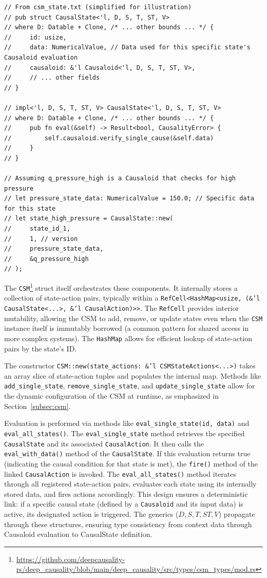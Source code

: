 \begin{lstlisting}[label={list:csm_state_def}, caption={Conceptual Definition of \texttt{CausalState} in Rust.}]
// From csm_state.txt (simplified for illustration)
// pub struct CausalState<'l, D, S, T, ST, V>
// where D: Datable + Clone, /* ... other bounds ... */ {
//     id: usize,
//     data: NumericalValue, // Data used for this specific state's Causaloid evaluation
//     causaloid: &'l Causaloid<'l, D, S, T, ST, V>,
//     // ... other fields
// }

// impl<'l, D, S, T, ST, V> CausalState<'l, D, S, T, ST, V>
// where D: Datable + Clone, /* ... other bounds ... */ {
//     pub fn eval(&self) -> Result<bool, CausalityError> {
//         self.causaloid.verify_single_cause(&self.data)
//     }
// }

// Assuming q_pressure_high is a Causaloid that checks for high pressure
// let pressure_state_data: NumericalValue = 150.0; // Specific data for this state
// let state_high_pressure = CausalState::new(
//     state_id_1, 
//     1, // version
//     pressure_state_data, 
//     &q_pressure_high 
// );
\end{lstlisting}

The \texttt{CSM}\footnote{\url{https://github.com/deepcausality-rs/deep_causality/blob/main/deep_causality/src/types/csm_types/mod.rs}} struct itself orchestrates these components. It internally stores a collection of state-action pairs, typically within a \texttt{RefCell<HashMap<usize, (\&'l CausalState<...>, \&'l CausalAction)>>}. The \texttt{RefCell} provides interior mutability, allowing the CSM to add, remove, or update states even when the \texttt{CSM} instance itself is immutably borrowed (a common pattern for shared access in more complex systems). The \texttt{HashMap} allows for efficient lookup of state-action pairs by the state's ID.

The constructor \texttt{CSM::new(state\_actions: \&'l CSMStateActions<...>)} takes an array slice of state-action tuples and populates the internal map. Methods like \texttt{add\_single\_state}, \texttt{remove\_single\_state}, and \texttt{update\_single\_state} allow for the dynamic configuration of the CSM at runtime, as emphasized in Section~\ref{subsec:csm}.

Evaluation is performed via methods like \texttt{eval\_single\_state(id, data)} and \texttt{eval\_all\_states()}. The \texttt{eval\_single\_state} method retrieves the specified \texttt{CausalState} and its associated \texttt{CausalAction}. It then calls the \texttt{eval\_with\_data()} method of the \texttt{CausalState}. If this evaluation returns true (indicating the causal condition for that state is met), the \texttt{fire()} method of the linked \texttt{CausalAction} is invoked. The \texttt{eval\_all\_states()} method iterates through all registered state-action pairs, evaluates each state using its internally stored data, and fires actions accordingly. This design ensures a deterministic link: if a specific causal state (defined by a \texttt{Causaloid} and its input data) is active, its designated action is triggered. The generics ($D, S, T, ST, V$) propagate through these structures, ensuring type consistency from context data through Causaloid evaluation to CausalState definition.